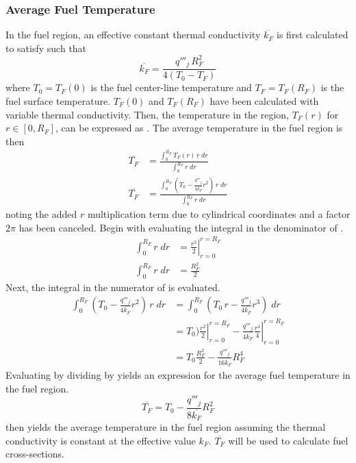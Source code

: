     \subsubsection{Average Fuel Temperature}
      In the fuel region, an effective constant thermal conductivity
      $\overline{k_F}$ is first calculated to satisfy
       such that
      \begin{equation}
        \label{eq:kfuel_constant}
        \overline{k_F} = \frac{q'''_j \, R_F^2}{4(T_0-T_F)}
      \end{equation}
      where $T_0 = T_F(0)$ is the fuel center-line temperature and
      $T_F=T_F(R_F)$ is the fuel surface temperature.
      $T_F(0)$ and $T_F(R_F)$ have been calculated with variable thermal
      conductivity. Then, the temperature in the region, $T_F(r)$ for $r \in 
      [0,R_F]$, can be expressed as . The average temperature in
      the fuel region is then
      \begin{align}
        \overline{T_F} &= \frac{\int_0^{R_F} T_F(r) \, r \; dr}
          {\int_0^{R_F} r \; dr} \\
        \label{eq:tfbar_integral}
        \overline{T_F} &= \frac{\int_0^{R_F} \left( T_0 - 
          \frac{q'''_j}{4 \overline{k_F}}
          r^2\right) \, r \; dr}{\int_0^{R_F} r \; dr}
      \end{align}
      noting the added $r$ multiplication term due to cylindrical coordinates
      and a factor $2 \pi$ has been canceled.
      Begin with evaluating the integral in the denominator of
      .
      \begin{align}
        \int_0^{R_F} r \; dr &= \left. \frac{r^2}{2} \right|_{r=0}^{r=R_F} \\
        \label{eq:tf_denominator}
        \int_0^{R_F} r \; dr &= \frac{R_F^2}{2}
      \end{align}
      Next, the integral in the numerator of  is 
      evaluated.
      \begin{align}
        \int_0^{R_F} \left( T_0 - \frac{q'''_j}{4 \overline{k_F}} r^2 \right)
          \, r \; dr&= 
          \int_0^{R_F} \left( T_0 \, r - \frac{q'''_j}{4\overline{k_F}} 
          r^3 \right) \; dr\\
        &= \left. T_0) \frac{r^2}{2} \right|_{r=0}^{r=R_F} -
          \left. \frac{q'''_j}{4 \overline{k_F}} \frac{r^4}{4} 
          \right|_{r=0}^{r=R_F} \\
        \label{eq:tf_numerator}
        &= T_0 \frac{R_F^2}{2} - \frac{q'''_j}{16 \overline{k_F}} R_F^4
      \end{align}
      Evaluating  by dividing  by
       yields an expression for the average fuel
      temperature in the fuel region.
      \begin{equation}
        \label{eq:tf_bar}
        \overline{T_F} = T_0 - \frac{q'''_j}{8 \overline{k_F}} R_F^2
      \end{equation}
       then yields the average temperature in the fuel region
      assuming the thermal conductivity is constant at the effective value
      $k_F$. $\overline{T_F}$ will be used to calculate fuel cross-sections. 


